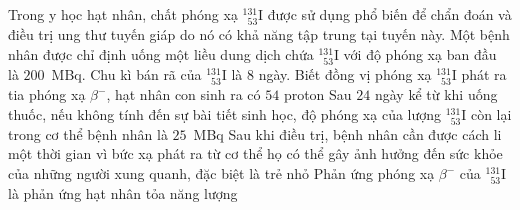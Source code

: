 	\begin{ex}%
		Trong y học hạt nhân, chất phóng xạ $^{131}_{\phantom{1}53}\text{I}$ được sử dụng phổ biến để chẩn đoán và điều trị ung thư tuyến giáp do nó có khả năng tập trung tại tuyến này. Một bệnh nhân được chỉ định uống một liều dung dịch chứa $^{131}_{\phantom{1}53}\text{I}$ với độ phóng xạ ban đầu là $200$~MBq. Chu kì bán rã của $^{131}_{\phantom{1}53}\text{I}$ là $8$ ngày.
		\choiceTFt
		{\True Biết đồng vị phóng xạ $^{131}_{\phantom{1}53}\text{I}$ phát ra tia phóng xạ $\beta^-$, hạt nhân con sinh ra có $54$ proton}
		{\True Sau $24$ ngày kể từ khi uống thuốc, nếu không tính đến sự bài tiết sinh học, độ phóng xạ của lượng $^{131}_{\phantom{1}53}\text{I}$ còn lại trong cơ thể bệnh nhân là $25$~MBq}
		{\True Sau khi điều trị, bệnh nhân cần được cách li một thời gian vì bức xạ phát ra từ cơ thể họ có thể gây ảnh hưởng đến sức khỏe của những người xung quanh, đặc biệt là trẻ nhỏ}
		{\True Phản ứng phóng xạ $\beta^-$ của $^{131}_{\phantom{1}53}\text{I}$ là phản ứng hạt nhân tỏa năng lượng}
	\end{ex}

